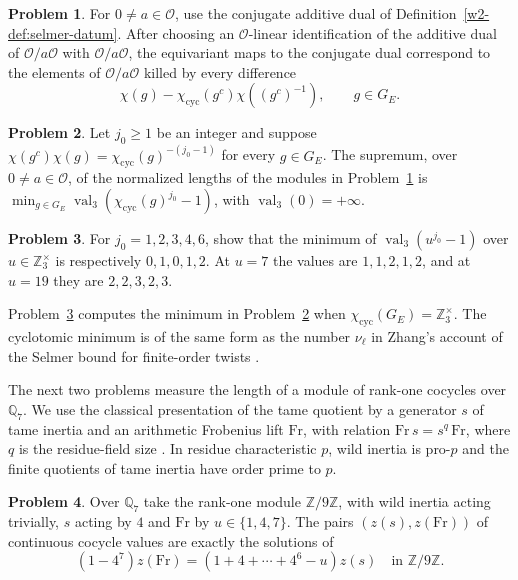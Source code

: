 \documentclass[reqno]{amsart}
\theoremstyle{definition}
\newtheorem{problem}{Problem}[section]
\theoremstyle{plain}
\theoremstyle{remark}
\newcommand{\Z}{\mathbb Z}
\newcommand{\Q}{\mathbb Q}
\newcommand{\Oc}{\mathcal O}
\newcommand{\cyc}{\chi_{\mathrm{cyc}}}
\newcommand{\val}{\operatorname{val}}
\begin{document}
\begin{problem}\label{pr:rank-one-dual}
For \(0\ne a\in\Oc\), use the conjugate additive dual of Definition~\ref{w2-def:selmer-datum}.  After choosing an \(\Oc\)-linear identification of the additive dual of \(\Oc/a\Oc\) with \(\Oc/a\Oc\), the equivariant maps to the conjugate dual correspond to the elements of \(\Oc/a\Oc\) killed by every difference
\[
  \chi(g)-\cyc(g^c)\chi((g^c)^{-1}),\qquad g\in G_E.
\]
\end{problem}

\begin{problem}\label{pr:rank-one-length}
Let \(j_0\ge 1\) be an integer and suppose \(\chi(g^c)\chi(g)=\cyc(g)^{-(j_0-1)}\) for every \(g\in G_E\).  The supremum, over \(0\ne a\in\Oc\), of the normalized lengths of the modules in Problem~\ref{pr:rank-one-dual} is \(\min_{g\in G_E}\val_3(\cyc(g)^{j_0}-1)\), with \(\val_3(0)=+\infty\).
\end{problem}

\begin{problem}\label{pr:rank-one-values}
For \(j_0=1,2,3,4,6\), show that the minimum of \(\val_3(u^{j_0}-1)\) over \(u\in\Z_3^\times\) is respectively \(0,1,0,1,2\).  At \(u=7\) the values are \(1,1,2,1,2\), and at \(u=19\) they are \(2,2,3,2,3\).
\end{problem}

Problem~\ref{pr:rank-one-values} computes the minimum in Problem~\ref{pr:rank-one-length} when \(\cyc(G_E)=\Z_3^\times\).  The cyclotomic minimum is of the same form as the number \(\nu_\ell\) in Zhang's account of the Selmer bound for finite-order twists \cite[\S5.2]{Zh}.

The next two problems measure the length of a module of rank-one cocycles over \(\Q_7\).  We use the classical presentation of the tame quotient by a generator \(s\) of tame inertia and an arithmetic Frobenius lift \(\mathrm{Fr}\), with relation \(\mathrm{Fr}\,s=s^q\,\mathrm{Fr}\), where \(q\) is the residue-field size \cite{SLF}.  In residue characteristic \(p\), wild inertia is pro-\(p\) and the finite quotients of tame inertia have order prime to \(p\).

\begin{problem}\label{pr:tame-model}
Over \(\Q_7\) take the rank-one module \(\Z/9\Z\), with wild inertia acting trivially, \(s\) acting by \(4\) and \(\mathrm{Fr}\) by \(u\in\{1,4,7\}\).  The pairs \((z(s),z(\mathrm{Fr}))\) of continuous cocycle values are exactly the solutions of
\[
  (1-4^7)z(\mathrm{Fr})=(1+4+\cdots+4^6-u)z(s)
  \quad\text{in }\Z/9\Z.
\]
\end{problem}
\end{document}
